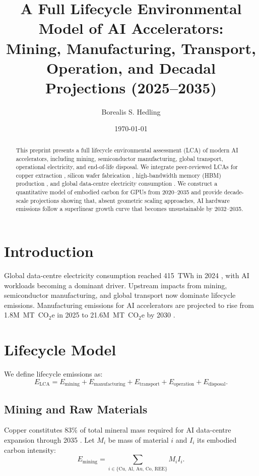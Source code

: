 \documentclass[12pt]{article}
\title{A Full Lifecycle Environmental Model of AI Accelerators:\\
Mining, Manufacturing, Transport, Operation, and Decadal Projections (2025--2035)}
\author{Borealis S. Hedling}
\date{\today}
\begin{document}
\maketitle

\begin{abstract}
This preprint presents a full lifecycle environmental assessment (LCA) of modern AI accelerators, 
including mining, semiconductor manufacturing, global transport, operational electricity, and end-of-life disposal. 
We integrate peer-reviewed LCAs for copper extraction \cite{amoah2026}, silicon wafer fabrication \cite{tsmc2024}, 
high-bandwidth memory (HBM) production \cite{techinsights2025}, and global data-centre electricity consumption \cite{iea2024}. 
We construct a quantitative model of embodied carbon for GPUs from 2020--2035 and provide decade-scale projections 
showing that, absent geometric scaling approaches, AI hardware emissions follow a superlinear growth curve 
that becomes unsustainable by 2032--2035.
\end{abstract}

\section{Introduction}
Global data-centre electricity consumption reached 415~TWh in 2024 \cite{iea2024}, 
with AI workloads becoming a dominant driver. 
Upstream impacts from mining, semiconductor manufacturing, and global transport now dominate lifecycle emissions. 
Manufacturing emissions for AI accelerators are projected to rise from 1.8M~MT~CO$_2$e in 2025 
to 21.6M~MT~CO$_2$e by 2030 \cite{techinsights2025}.

\section{Lifecycle Model}
We define lifecycle emissions as:
\[
E_{\text{LCA}} = E_{\text{mining}} + E_{\text{manufacturing}} + 
E_{\text{transport}} + E_{\text{operation}} + E_{\text{disposal}}.
\]

\subsection{Mining and Raw Materials}
Copper constitutes 83\% of total mineral mass required for AI data-centre expansion through 2035 \cite{amoah2026}. 
Let $M_i$ be mass of material $i$ and $I_i$ its embodied carbon intensity:
\[
E_{\text{mining}} = \sum_{i \in \{\text{Cu, Al, Au, Co, REE}\}} M_i I_i.
\]
\end{document}
